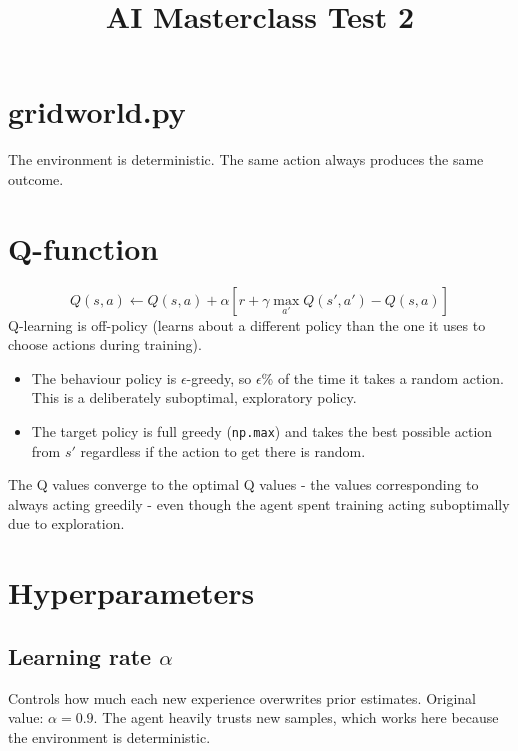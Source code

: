 \documentclass[12pt, a4paper]{article}
\title{AI Masterclass Test 2}
\author{}
\date{}
\begin{document}
\maketitle

\section{gridworld.py}
The environment is deterministic. The same action always produces the same outcome.

\section{Q-function}

$$Q(s, a) \leftarrow Q(s, a) + \alpha [ r + \gamma \max_{a'} Q(s', a') - Q(s, a) ]$$
Q-learning is off-policy (learns about a different policy than the one it uses to choose actions during training).
\begin{itemize}
    \item The behaviour policy is $\epsilon$-greedy, so $\epsilon$\% of the time it takes a random action. This is a deliberately suboptimal, exploratory policy.
    \item The target policy is full greedy (\texttt{np.max}) and takes the best possible action from $s'$ regardless if the action to get there is random.
\end{itemize}
The Q values converge to the optimal Q values - the values corresponding to always acting greedily - even though the agent spent training acting suboptimally due to exploration.


\section{Hyperparameters}
\subsection{Learning rate $\alpha$}
Controls how much each new experience overwrites prior estimates.\newline
Original value: $\alpha = 0.9$. The agent heavily trusts new samples, which works here because the environment is deterministic.
\end{document}
